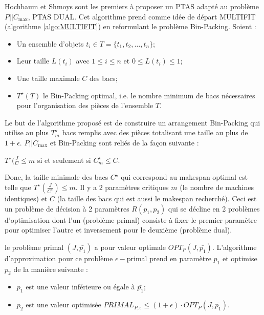\documentclass[a4paper,12pt]{report}
\theoremstyle{plain}				%
\theoremstyle{definition}				%
\newcommand\problemGrahamP{$P||C_{\max}$\xspace}
\begin{document}
Hochbaum et Shmoys sont les premiers à proposer un PTAS \cite{hochbaum1987using} 
  adapté au problème \problemGrahamP, PTAS DUAL. 
Cet algorithme prend comme idée de départ MULTIFIT (algorithme \ref{algo:MULTIFIT}) 
  en reformulant le problème Bin-Packing. Soient : 
\begin{itemize}
	\item Un ensemble d'objets $t_i \in T=\{t_1, t_2, \ldots, t_n\}$;
	
	\item Leur taille $L(t_i)$ avec $1 \leq i \leq n$ et $0 \leq L(t_i) \leq 1$;
	
	\item Une taille maximale $C$ des bacs;
		
	\item $T^{\star}(T)$ le Bin-Packing optimal, 
	i.e. le nombre minimum de bacs nécessaires pour l'organisation des pièces de l'ensemble $T$.
	
\end{itemize}    

Le but de l'algorithme proposé est de construire un arrangement Bin-Packing qui utilise au plus $T^{\star}_m$ 
  bacs remplis avec des pièces totalisant une taille au plus de $1+\epsilon$. 
\problemGrahamP et Bin-Packing sont reliés de la façon suivante :

$T^{\star}(\frac{J}{C}\leq m$ si et seulement si $C^{\star}_m \leq C$. 

Donc, la taille minimale des bacs $C^{\star}$ qui correspond au makespan optimal est telle que 
  $T^{\star}\left( \frac{J}{C^{\star}} \right) \leq m$.
Il y a 2 paramètres critiques $m$ (le nombre de machines identiques) et 
  $C$ (la taille des bacs qui est aussi le makespan recherché). 
Ceci est un problème de décision à 2 paramètres $R(p_1, p_2)$ qui se décline en 2 problèmes d'optimisation 
  dont l'un (problème primal) consiste à fixer le premier paramètre pour optimiser l'autre et 
  inversement pour le deuxième (problème dual).

le problème primal $(J,\bar{p_1})$ a pour valeur optimale $OPT_P(J,\bar{p_1})$. 
L'algorithme d'approximation pour ce problème $\epsilon-$primal prend en paramètre $p_1$ 
  et optimise $p_2$ de la manière suivante :

\begin{itemize}
	\item $p_1$ est une valeur inférieure ou égale à $\bar{p_1}$;
	\item $p_2$ est une valeur optimisée $PRIMAL_{P,\epsilon} \le (1+\epsilon)\cdot OPT_P(J,\bar{p_1})$.	 
\end{itemize}
\end{document}
